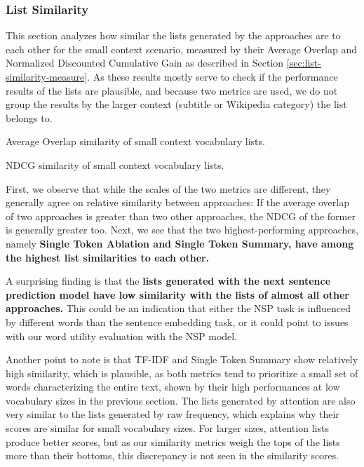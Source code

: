 \subsubsection{List Similarity} \label{sec:small-context-similarity}
This section analyzes how similar the lists generated by the approaches are to each other for the small context scenario, measured by their Average Overlap and Normalized Discounted Cumulative Gain as described in Section \ref{sec:list-similarity-measure}.
As these results mostly serve to check if the performance results of the lists are plausible, and because two metrics are used, we do not group the results by the larger context (subtitle or Wikipedia category) the list belongs to.

\begin{table}[H]
	\centering
	\resizebox{\textwidth}{!}{%
		
	}
	\caption{Average Overlap similarity of small context vocabulary lists.}
	\label{tbl:similarity-results-single-average-overlap}
\end{table}

\begin{table}[H]
	\centering
	\resizebox{\textwidth}{!}{%
		
	}
	\caption{NDCG similarity of small context vocabulary lists.}
	\label{tbl:similarity-results-single-ndcg}
\end{table}

First, we observe that while the scales of the two metrics are different, they generally agree on relative similarity between approaches:
If the average overlap of two approaches is greater than two other approaches, the NDCG of the former is generally greater too.
Next, we see that the two highest-performing approaches, namely \textbf{Single Token Ablation and Single Token Summary, have among the highest list similarities to each other.}

A surprising finding is that the \textbf{lists generated with the next sentence prediction model have low similarity with the lists of almost all other approaches.}
This could be an indication that either the NSP task is influenced by different words than the sentence embedding task, or it could point to issues with our word utility evaluation with the NSP model.

Another point to note is that TF-IDF and Single Token Summary show relatively high similarity, which is plausible, as both metrics tend to prioritize a small set of words characterizing the entire text, shown by their high performances at low vocabulary sizes in the previous section.
The lists generated by attention are also very similar to the lists generated by raw frequency, which explains why their scores are similar for small vocabulary sizes.
For larger sizes, attention lists produce better scores, but as our similarity metrics weigh the tops of the lists more than their bottoms, this discrepancy is not seen in the similarity scores.


